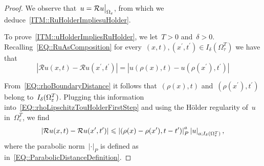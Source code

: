 \documentclass[12pt,a4paper]{amsart}
\makeatletter
\numberwithin{equation}{section}
\theoremstyle{definition}
\theoremstyle{remark}
\newcommand{\eps}{\varepsilon}
\newcommand{\abs}[1]{\left\lvert#1\right\rvert}
\newcommand{\restr}[2]{{\left.\kern-\nulldelimiterspace#1\vphantom{\big|}\right|_{#2}}}
\renewcommand{\leq}{\leqslant}
\newcommand{\const}[1]{%
  \csname const@#1\endcsname%
}
\makeatother
\begin{document}
\begin{proof}
    We observe that~$u = \restr{\mathcal{R}u}{\Omega_\eps}$, from which we deduce~\ref{ITM::RuHolderImpliesuHolder}.

    To prove~\ref{ITM::uHolderImpliesRuHolder}, we let~$T > 0$ and~$\delta > 0$. Recalling~\eqref{EQ::RuAsComposition} for every~$(x,t),(x^\prime,t^\prime) \in I_\delta(\Omega_\tau^T)$ we have that
    \begin{equation}\label{EQ::rhoLipschitzTouHolderFirstStep}
        \abs{\mathcal{R}u(x,t)-\mathcal{R}u(x^\prime, t^\prime)} = \abs{u(\rho(x),t)-u(\rho(x^\prime), t^\prime)}
    \end{equation}

    From~\eqref{EQ::rhoBoundaryDistance} it follows that~$(\rho(x),t)$ and~$(\rho(x^\prime),t^\prime)$ belong to~$I_{\const{CONST::rhoBoundaryDistance}\delta}(\Omega_\eps^T)$. Plugging this information into~\eqref{EQ::rhoLipschitzTouHolderFirstStep} and using the Hölder regularity of~$u$ in~$\Omega_\eps^T$, we find
    \begin{equation}\label{EQ::rhoLipschitzTouHolderSecondStep}
        \abs{\mathcal{R}u(x,t)-\mathcal{R}u(x^\prime, t^\prime)} \leq \abs{(\rho(x)-\rho(x^\prime), t-t^\prime)}_P^a \abs{u}_{a;I_{\const{CONST::rhoBoundaryDistance}\delta}(\Omega_\eps^T)},
    \end{equation}
    where the parabolic norm~$\abs{\cdot}_P$ is defined as in~\eqref{EQ::ParabolicDistanceDefinition}.


\end{proof}
\end{document}
